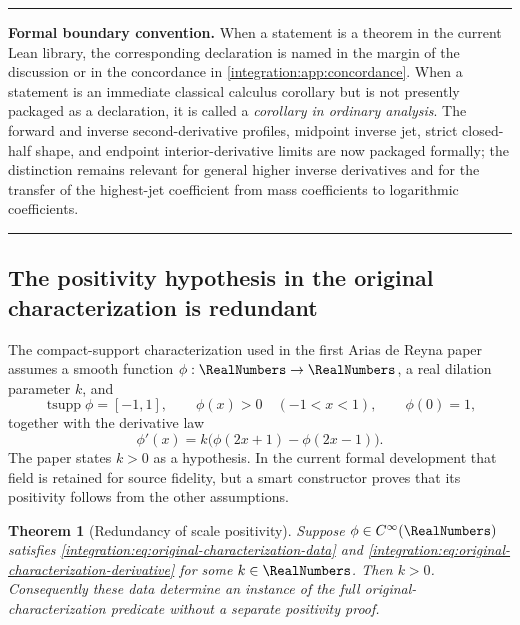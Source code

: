 \documentclass[11pt,oneside]{article}
\newtheorem{theorem}{Theorem}[section]
\theoremstyle{definition}
\theoremstyle{remark}
\newenvironment{boxedremark}{%
  \par\smallskip\noindent\begin{center}\begin{minipage}{0.94\textwidth}%
  \color{black}\hrule\vspace{0.6em}\small
}{%
  \vspace{0.6em}\hrule\end{minipage}\end{center}\smallskip
}
\begin{document}
\begin{boxedremark}
\textbf{Formal boundary convention.}  When a statement is a theorem in the current Lean
library, the corresponding declaration is named in the margin of the discussion or in the
concordance in \cref{integration:app:concordance}.  When a statement is an immediate classical calculus
corollary but is not presently packaged as a declaration, it is called a \emph{corollary in
ordinary analysis}.  The forward and inverse second-derivative profiles, midpoint inverse
jet, strict closed-half shape, and endpoint interior-derivative limits are now packaged
formally; the distinction remains relevant for general higher inverse
derivatives and for the transfer of the highest-jet coefficient from mass coefficients to
logarithmic coefficients.
\end{boxedremark}

\subsection{The positivity hypothesis in the original characterization is redundant}
\label{integration:sec:scale-positive}

The compact-support characterization used in the first Arias de Reyna paper
\cite{integration:arias05442} assumes a smooth function $\phi:\RealNumbers\to\RealNumbers$, a real dilation
parameter $k$, and
\begin{equation}
 \operatorname{tsupp}\phi=[-1,1],\qquad
 \phi(x)>0\quad(-1<x<1),\qquad
 \phi(0)=1,
 \label{integration:eq:original-characterization-data}
\end{equation}
together with the derivative law
\begin{equation}
 \phi'(x)=k\bigl(\phi(2x+1)-\phi(2x-1)\bigr).
 \label{integration:eq:original-characterization-derivative}
\end{equation}
The paper states $k>0$ as a hypothesis.  In the current formal development that field is retained
for source fidelity, but a smart constructor proves that its positivity follows from the other
assumptions.

\begin{theorem}[Redundancy of scale positivity]
\label{integration:thm:scale-positive-redundant}
Suppose $\phi\in C^\infty(\RealNumbers)$ satisfies
\eqref{integration:eq:original-characterization-data} and
\eqref{integration:eq:original-characterization-derivative} for some $k\in\RealNumbers$.  Then $k>0$.
Consequently these data determine an instance of the full original-characterization predicate
without a separate positivity proof.
\end{theorem}
\end{document}
